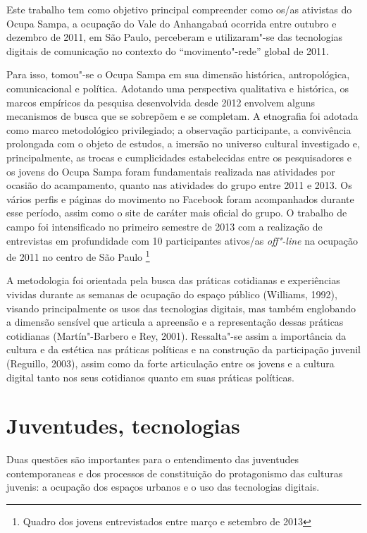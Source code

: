 Este trabalho tem como objetivo principal compreender como os/as
ativistas do Ocupa Sampa, a ocupação do Vale do Anhangabaú ocorrida
entre outubro e dezembro de 2011, em São Paulo, perceberam e
utilizaram"-se das tecnologias digitais de comunicação no contexto do
``movimento"-rede'' global de 2011.

Para isso, tomou"-se o Ocupa Sampa em sua dimensão histórica,
antropológica, comunicacional e política. Adotando uma perspectiva
qualitativa e histórica, os marcos empíricos da pesquisa desenvolvida
desde 2012 envolvem alguns mecanismos de busca que se sobrepõem e se
completam. A etnografia foi adotada como marco metodológico
privilegiado; a observação participante, a convivência prolongada com o
objeto de estudos, a imersão no universo cultural investigado e,
principalmente, as trocas e cumplicidades estabelecidas entre os
pesquisadores e os jovens do Ocupa Sampa foram fundamentais realizada
nas atividades por ocasião do acampamento, quanto nas atividades do
grupo entre 2011 e 2013. Os vários perfis e páginas do movimento no
Facebook foram acompanhados durante esse período, assim como o site de
caráter mais oficial do grupo. O trabalho de campo foi intensificado no
primeiro semestre de 2013 com a realização de entrevistas em
profundidade com 10 participantes ativos/as \emph{off"-line} na ocupação
de 2011 no centro de São Paulo \footnote{Quadro dos jovens
  entrevistados entre março e setembro de 2013}

A metodologia foi orientada pela busca das práticas cotidianas e
experiências vividas durante as semanas de ocupação do espaço público
(Williams, 1992), visando principalmente os usos das tecnologias
digitais, mas também englobando a dimensão sensível que articula a
apreensão e a representação dessas práticas cotidianas (Martín"-Barbero e
Rey, 2001). Ressalta"-se assim a importância da cultura e da estética nas
práticas políticas e na construção da participação juvenil (Reguillo,
2003), assim como da forte articulação entre os jovens e a cultura
digital tanto nos seus cotidianos quanto em suas práticas políticas.

\section{Juventudes, tecnologias}

Duas questões são importantes para o entendimento das juventudes
contemporaneas e dos processos de constituição do protagonismo das
culturas juvenis: a ocupação dos espaços urbanos e o uso das tecnologias
digitais.

